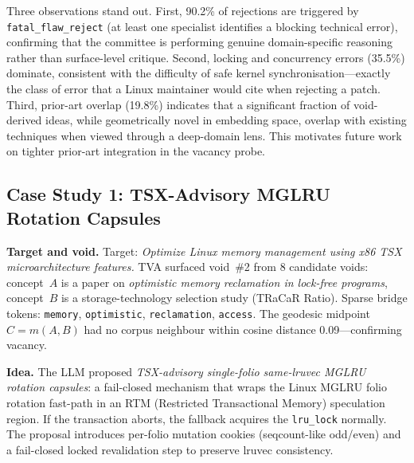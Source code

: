 \documentclass[11pt,twocolumn]{article}
\begin{document}
Three observations stand out.  First, 90.2\% of rejections are triggered
by \texttt{fatal\_flaw\_reject} (at least one specialist identifies a
blocking technical error), confirming that the committee is performing
genuine domain-specific reasoning rather than surface-level critique.
Second, locking and concurrency errors (35.5\%) dominate, consistent
with the difficulty of safe kernel synchronisation---exactly the class
of error that a Linux maintainer would cite when rejecting a patch.
Third, prior-art overlap (19.8\%) indicates that a significant fraction
of void-derived ideas, while geometrically novel in embedding space,
overlap with existing techniques when viewed through a deep-domain lens.
This motivates future work on tighter prior-art integration in the
vacancy probe.

\subsection{Case Study 1: TSX-Advisory MGLRU Rotation Capsules}

\textbf{Target and void.}  Target: \emph{Optimize Linux memory
management using x86 TSX microarchitecture features.}  TVA surfaced
void~\#2 from 8 candidate voids: concept~$A$ is a paper on
\emph{optimistic memory reclamation in lock-free programs}, concept~$B$
is a storage-technology selection study (TRaCaR Ratio).  Sparse bridge
tokens: \texttt{memory}, \texttt{optimistic}, \texttt{reclamation},
\texttt{access}.  The geodesic midpoint $C = m(A,B)$ had no corpus
neighbour within cosine distance 0.09---confirming vacancy.

\textbf{Idea.}  The LLM proposed \emph{TSX-advisory single-folio
same-lruvec MGLRU rotation capsules}: a fail-closed mechanism that
wraps the Linux MGLRU folio rotation fast-path in an RTM (Restricted
Transactional Memory) speculation region.  If the transaction aborts,
the fallback acquires the \texttt{lru\_lock} normally.  The proposal
introduces per-folio mutation cookies (seqcount-like odd/even) and a
fail-closed locked revalidation step to preserve lruvec consistency.
\end{document}
